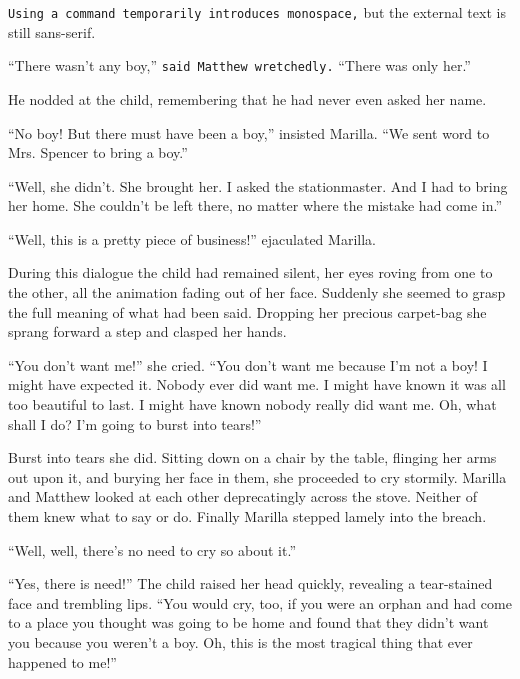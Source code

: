 \documentclass[a4paper]{article}
\begin{document}
 \texttt{Using a command temporarily introduces monospace,} but the external text is still sans-serif. 


\sffamily ``There wasn't any boy,'' \texttt{said Matthew wretchedly.} ``There was only her.''

He nodded at the child, \textrm{remembering that he had never even} asked her name.

\ttfamily``No boy! But there must have been a boy,'' insisted Marilla. ``We sent word to Mrs. Spencer to bring a boy.''

``Well, she didn't. She brought her. I asked the stationmaster. And I had to bring her home. She couldn't be left there, no matter where the mistake had come in.''

\rmfamily``Well, this is a pretty piece of business!'' ejaculated Marilla.

During this dialogue the child had remained silent, her eyes roving from one to the other, all the animation fading out of her face. Suddenly she seemed to grasp the full meaning of what had been said. Dropping her precious carpet-bag she sprang forward a step and clasped her hands.

``You don't want me!'' she cried. ``You don't want me because I'm not a boy! I might have expected it. Nobody ever did want me. I might have known it was all too beautiful to last. I might have known nobody really did want me. Oh, what shall I do? I'm going to burst into tears!''

Burst into tears she did. Sitting down on a chair by the table, flinging her arms out upon it, and burying her face in them, she proceeded to cry stormily. Marilla and Matthew looked at each other deprecatingly across the stove. Neither of them knew what to say or do. Finally Marilla stepped lamely into the breach.

``Well, well, there's no need to cry so about it.''

``Yes, there is need!'' The child raised her head quickly, revealing a tear-stained face and trembling lips. ``You would cry, too, if you were an orphan and had come to a place you thought was going to be home and found that they didn't want you because you weren't a boy. Oh, this is the most tragical thing that ever happened to me!''
\end{document}
